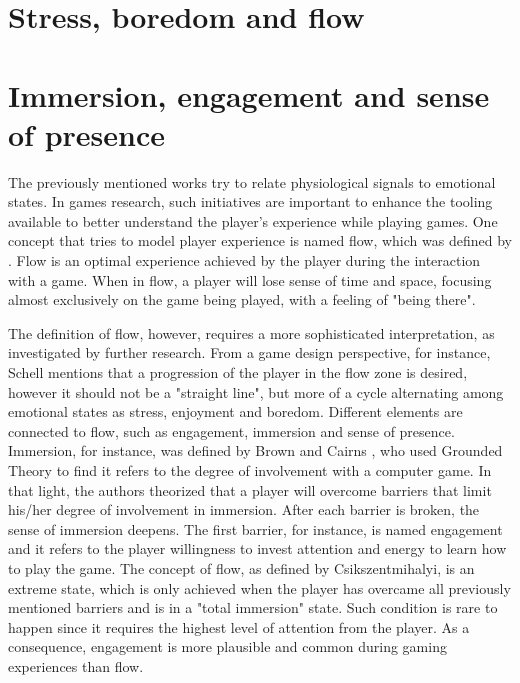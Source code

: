 \section{Stress, boredom and flow}




\section{Immersion, engagement and sense of presence}

The previously mentioned works try to relate physiological signals to emotional states. In games research, such initiatives are important to enhance the tooling available to better understand the player's experience while playing games. One concept that tries to model player experience is named flow, which was defined by \textcite{csikszentmihalyi1991flow}. Flow is an optimal experience achieved by the player during the interaction with a game. When in flow, a player will lose sense of time and space, focusing almost exclusively on the game being played, with a feeling of "being there".

The definition of flow, however, requires a more sophisticated interpretation, as investigated by further research. From a game design perspective, for instance, Schell \parencite{schell2014art} mentions that a progression of the player in the flow zone is desired, however it should not be a "straight line", but more of a cycle alternating among emotional states as stress, enjoyment and boredom. Different elements are connected to flow, such as engagement, immersion and sense of presence. Immersion, for instance, was defined by Brown and Cairns \parencite{brown2004grounded}, who used Grounded Theory to find it refers to the degree of involvement with a computer game. In that light, the authors theorized that a player will overcome barriers that limit his/her degree of involvement in immersion. After each barrier is broken, the sense of immersion deepens. The first barrier, for instance, is named engagement and it refers to the player willingness  to invest attention and energy to learn how to play the game. The concept of flow, as defined by Csikszentmihalyi, is an extreme state, which is only achieved when the player has overcame all previously mentioned barriers and is in a "total immersion" state. Such condition is rare to happen since it requires the highest level of attention from the player. As a consequence, engagement is more plausible and common during gaming experiences than flow.

